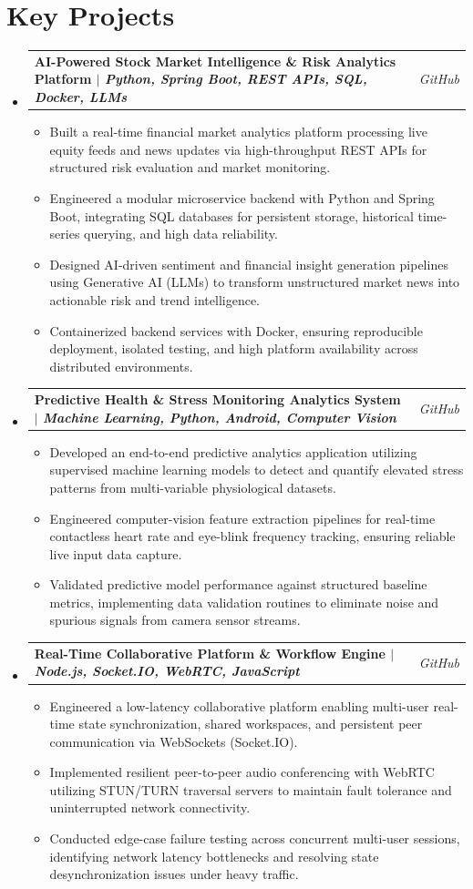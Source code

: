 \documentclass[letterpaper,10pt]{article}
\makeatletter
\newcommand{\resumeItem}[1]{
  \item\small{
    {#1 \vspace{-2pt}}
  }
}
\newcommand{\resumeProjectHeading}[2]{
  \vspace{-2pt}\item
    \begin{tabular*}{0.97\textwidth}[t]{l@{\extracolsep{\fill}}r}
      \textbf{#1} & \textit{\small #2} \\
    \end{tabular*}\vspace{-5pt}
}
\newcommand{\resumeSubHeadingListStart}{\begin{itemize}[leftmargin=0.15in, label={}]}
\newcommand{\resumeSubHeadingListEnd}{\end{itemize}}
\newcommand{\resumeItemListStart}{\begin{itemize}[leftmargin=0.15in, label=$\bullet$]}
\newcommand{\resumeItemListEnd}{\end{itemize}\vspace{-4pt}}
\makeatother
\begin{document}
\section{Key Projects}
  \resumeSubHeadingListStart
    \resumeProjectHeading
      {AI-Powered Stock Market Intelligence \& Risk Analytics Platform $|$ \emph{Python, Spring Boot, REST APIs, SQL, Docker, LLMs}}{GitHub}
      \resumeItemListStart
        \resumeItem{Built a real-time financial market analytics platform processing live equity feeds and news updates via high-throughput REST APIs for structured risk evaluation and market monitoring.}
        \resumeItem{Engineered a modular microservice backend with Python and Spring Boot, integrating SQL databases for persistent storage, historical time-series querying, and high data reliability.}
        \resumeItem{Designed AI-driven sentiment and financial insight generation pipelines using Generative AI (LLMs) to transform unstructured market news into actionable risk and trend intelligence.}
        \resumeItem{Containerized backend services with Docker, ensuring reproducible deployment, isolated testing, and high platform availability across distributed environments.}
      \resumeItemListEnd

    \resumeProjectHeading
      {Predictive Health \& Stress Monitoring Analytics System $|$ \emph{Machine Learning, Python, Android, Computer Vision}}{GitHub}
      \resumeItemListStart
        \resumeItem{Developed an end-to-end predictive analytics application utilizing supervised machine learning models to detect and quantify elevated stress patterns from multi-variable physiological datasets.}
        \resumeItem{Engineered computer-vision feature extraction pipelines for real-time contactless heart rate and eye-blink frequency tracking, ensuring reliable live input data capture.}
        \resumeItem{Validated predictive model performance against structured baseline metrics, implementing data validation routines to eliminate noise and spurious signals from camera sensor streams.}
      \resumeItemListEnd

    \resumeProjectHeading
      {Real-Time Collaborative Platform \& Workflow Engine $|$ \emph{Node.js, Socket.IO, WebRTC, JavaScript}}{GitHub}
      \resumeItemListStart
        \resumeItem{Engineered a low-latency collaborative platform enabling multi-user real-time state synchronization, shared workspaces, and persistent peer communication via WebSockets (Socket.IO).}
        \resumeItem{Implemented resilient peer-to-peer audio conferencing with WebRTC utilizing STUN/TURN traversal servers to maintain fault tolerance and uninterrupted network connectivity.}
        \resumeItem{Conducted edge-case failure testing across concurrent multi-user sessions, identifying network latency bottlenecks and resolving state desynchronization issues under heavy traffic.}
      \resumeItemListEnd
  \resumeSubHeadingListEnd
\end{document}
